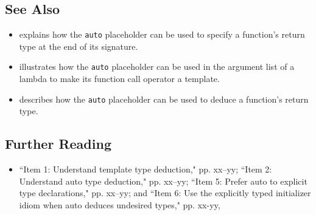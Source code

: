 \subsection[See Also]{See Also}\label{see-also}

\begin{itemize}
\item{explains how the \lstinline!auto! placeholder can be used to specify a function’s return type at the end of its signature.}
\item{ illustrates how the \lstinline!auto! placeholder can be used in the argument list of a lambda to make its function call operator a template.}
\item{describes how the \lstinline!auto! placeholder can be used to deduce a function’s return type.}
\end{itemize}

\subsection[Further Reading]{Further Reading}

\begin{itemize}
\item{``Item 1: Understand template type deduction," pp. xx--yy; ``Item 2: Understand auto type deduction," pp. xx--yy; ``Item 5: Prefer auto to explicit type declarations," pp. xx--yy; and ``Item 6: Use the explicitly typed initializer idiom when auto deduces undesired types," pp. xx-yy, \cite{meyers15b}}
\end{itemize}


